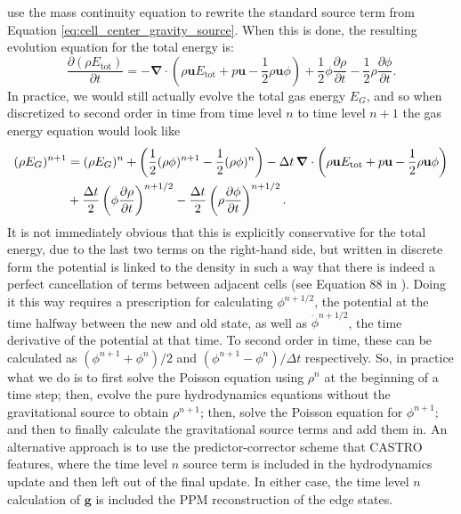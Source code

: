 \documentclass[12pt,preprint]{aastex}
\begin{document}
\citet{marcello:2012} use the mass continuity equation to rewrite the standard source term from Equation \ref{eq:cell_center_gravity_source}. When this is done, the resulting evolution equation for the total energy is:
\begin{equation}
  \frac{\partial (\rho E_{\text{tot}})}{\partial t} = -\bm{\nabla}\cdot\left(\rho \mathbf{u} E_{\text{tot}} + p\mathbf{u} - \frac{1}{2}\rho\mathbf{u}\phi\right) + \frac{1}{2}\phi\frac{\partial \rho}{\partial t} - \frac{1}{2}\rho\frac{\partial \phi}{\partial t}.
\end{equation}
In practice, we would still actually evolve the total gas energy $E_G$, and so when discretized to second order in time from time level $n$ to time level $n+1$ the gas energy equation would look like
\begin{align}
  (\rho E_G)^{n+1} &= (\rho E_G)^{n} + \left(\frac{1}{2} (\rho \phi)^{n+1} - \frac{1}{2} (\rho \phi)^{n}\right) - \Delta t\, \bm{\nabla}\cdot\left(\rho \mathbf{u} E_{\text{tot}} + p\mathbf{u} - \frac{1}{2}\rho\mathbf{u}\phi\right) \notag \\
   &+ \frac{\Delta t}{2}\left(\phi \frac{\partial \rho}{\partial t}\right)^{n+1/2} - \frac{\Delta t}{2} \left(\rho \frac{\partial \phi}{\partial t}\right)^{n+1/2}.
\end{align}
It is not immediately obvious that this is explicitly conservative for the total energy, due to the last two terms on the right-hand side, but written in discrete form the potential is linked to the density in such a way that there is indeed a perfect cancellation of terms between adjacent cells (see Equation 88 in \citeauthor{marcello:2012}). Doing it this way requires a prescription for calculating $\phi^{n+1/2}$, the potential at the time halfway between the new and old state, as well as $\dot{\phi}^{n+1/2}$, the time derivative of the potential at that time. To second order in time, these can be calculated as $(\phi^{n+1} + \phi^{n})/2$ and $(\phi^{n+1}-\phi^{n})/\Delta t$ respectively. So, in practice what we do is to first solve the Poisson equation using $\rho^n$ at the beginning of a time step; then, evolve the pure hydrodynamics equations without the gravitational source to obtain $\rho^{n+1}$; then, solve the Poisson equation for $\phi^{n+1}$; and then to finally calculate the gravitational source terms and add them in. An alternative approach is to use the predictor-corrector scheme that CASTRO features, where the time level $n$ source term is included in the hydrodynamics update and then left out of the final update. In either case, the time level $n$ calculation of $\mathbf{g}$ is included the PPM reconstruction of the edge states.
\end{document}
